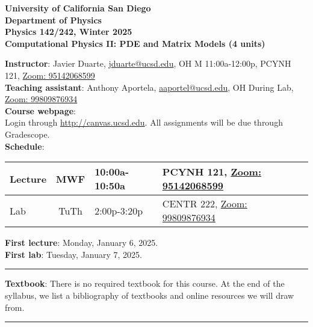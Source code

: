 \documentclass[12pt]{article}
\begin{document}
\begin{center}
  \textbf{
    University of California San Diego\\
    Department of Physics\\
    Physics 142/242, Winter 2025\\
    Computational Physics II: PDE and Matrix Models (4 units)
  }
\end{center}

\noindent\textbf{Instructor}: Javier Duarte, \href{mailto:jduarte@ucsd.edu}{jduarte@ucsd.edu}, OH M 11:00a-12:00p, PCYNH 121, \href{https://ucsd.zoom.us/j/95142068599}{Zoom: 95142068599}\\
\noindent \textbf{Teaching assistant}: Anthony Aportela, \href{mailto:aaportel@ucsd.edu}{aaportel@ucsd.edu}, OH During Lab, \href{https://ucsd.zoom.us/j/99809876934}{Zoom: 99809876934}\\

\noindent\textbf{Course webpage}:\\
\hspace*{1cm}Login through \href{http://canvas.ucsd.edu}{http://canvas.ucsd.edu}.
All assignments will be due through Gradescope.\\

\noindent\textbf{Schedule}:
\begin{center}
  \begin{tabular}{|l|c|l|m{90mm}|}
    \hline
    Lecture & MWF  & 10:00a-10:50a & PCYNH	121, \href{https://ucsd.zoom.us/j/95142068599}{Zoom: 95142068599} \\\hline
    Lab     & TuTh & 2:00p-3:20p   & CENTR	222, \href{https://ucsd.zoom.us/j/99809876934}{Zoom: 99809876934} \\\hline\end{tabular}
\end{center}

\noindent\textbf{First lecture}: Monday, January 6, 2025.\\
\textbf{First lab}: Tuesday, January 7, 2025.

\begin{center}
  \rule{\textwidth}{0.5pt}
\end{center}

\noindent\textbf{Textbook}: There is no required textbook for this course.
At the end of the syllabus, we list a bibliography of textbooks and online resources we will draw from.

\begin{center}
  \rule{\textwidth}{0.5pt}
\end{center}
\end{document}
